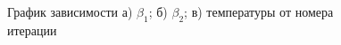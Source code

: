 \documentclass[12pt, twoside]{article}
\begin{document}
\begin{figure}[!ht]
{\begin{minipage}[h]{0.5\linewidth}
    \end{minipage}}
    \caption{График зависимости а) $\beta_1$; б) $\beta_2$; в) температуры от номера итерации}
    \label{fig:meta_iter}
\end{figure}




\end{document}
